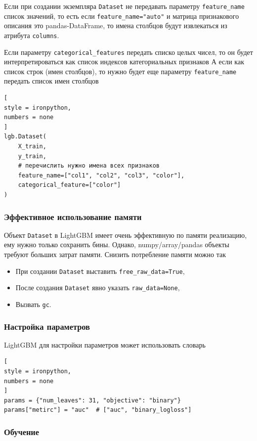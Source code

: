 \documentclass[%
	11pt,
	a4paper,
	utf8,
		]{article}
\begin{document}
Если при создании экземпляра \verb|Dataset| не передавать параметру \verb|feature_name| список значений, то есть если \verb|feature_name="auto"| и матрица признакового описания это pandas-DataFrame, то имена столбцов будут извлекаться из атрибута \verb|columns|. 

Если параметру \verb|categorical_features| передать списко целых чисел, то он будет интерпретироваться как список индексов категориальных признаков А если как список строк (имен столбцов), то нужно будет еще параметру \verb|feature_name| передать список имен столбцов
\begin{lstlisting}[
style = ironpython,
numbers = none
]
lgb.Dataset(
    X_train,
    y_train,
    # перечислить нужно имена всех признаков
    feature_name=["col1", "col2", "col3", "color"],
    categorical_feature=["color"]
)
\end{lstlisting}

\subsubsection{Эффективное использование памяти}

Объект \verb|Dataset| в LightGBM имеет очень эффективную по памяти реализацию, ему нужно только сохранить бины. Однако, numpy/array/pandas объекты требуют больших затрат памяти. Снизить потребление памяти можно так
\begin{itemize}
	\item При создании \verb|Dataset| выставить \verb|free_raw_data=True|,
	
	\item После создания \verb|Dataset| явно указать \verb|raw_data=None|,
	
	\item Вызвать \verb|gc|.
\end{itemize}

\subsubsection{Настройка параметров}

LightGBM для настройки параметров может использовать словарь
\begin{lstlisting}[
style = ironpython,
numbers = none
]
params = {"num_leaves": 31, "objective": "binary"}
params["metirc"] = "auc"  # ["auc", "binary_logloss"]
\end{lstlisting}

\subsubsection{Обучение}
\end{document}
